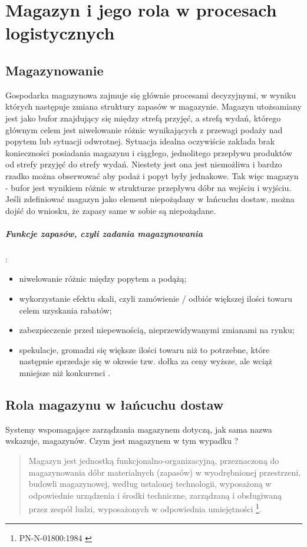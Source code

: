 \chapter{Magazyn i jego rola w procesach logistycznych}
\label{c4:c4}

\section{Magazynowanie}
	Gospodarka magazynowa zajmuje się głównie procesami decyzyjnymi, w wyniku których następuje 
	zmiana struktury zapasów w magazynie. Magazyn utożsamiany jest jako bufor znajdujący się
	między strefą przyjęć, a strefą wydań, którego głównym celem jest niwelowanie
	różnic wynikających z przewagi podaży nad popytem lub sytuacji odwrotnej. Sytuacja idealna
	oczywiście zakłada brak konieczności posiadania magazynu i ciągłego, jednolitego przepływu
	produktów od strefy przyjęć do strefy wydań. Niestety jest ona jest niemożliwa i bardzo
	rzadko można obserwować aby podaż i popyt były jednakowe. Tak więc magazyn - bufor jest
	wynikiem różnic w strukturze przepływu dóbr na wejściu i wyjściu. 
	Jeśli zdefiniować magazyn jako element niepożądany w łańcuchu dostaw, można dojść do wniosku, 
	że zapasy same w sobie są niepożądane.

	\paragraph{Funkcje zapasów, czyli zadania magazynowania}:
	\begin{itemize}
		\item niwelowanie różnic między popytem a podążą;
		\item wykorzystanie efektu skali, czyli zamówienie / odbiór większej ilości towaru celem uzyskania
		rabatów;
		\item zabezpieczenie przed niepewnością, nieprzewidywanymi zmianami na rynku;
		\item spekulacje, gromadzi się większe ilości towaru niż to potrzebne, które następnie sprzedaje się
		w okresie tzw. dołka za ceny wyższe, ale wciąż mniejsze niż konkurenci \cite{systemyLogistyczne_pfohl}.
	\end{itemize}		
	 
\section{Rola magazynu w łańcuchu dostaw}
	Systemy wspomagające zarządzania magazynem dotyczą, jak sama nazwa wskazuje, magazynów.
	Czym jest magazynem w tym wypadku ?
	\begin{quotation}
		Magazyn jest jednostką funkcjonalno-organizacyjną, przeznaczoną do magazynowania
		dóbr materialnych (zapasów) w wyodrębnionej przestrzeni, budowli magazynowej, według ustalonej
		technologii, wyposażoną w odpowiednie urządzenia i środki techniczne, zarządzaną i obsługiwaną
		przez zespół ludzi, wyposażonych w odpowiednia umiejętności \footnote{PN-N-01800:1984 \cite{norm_warehouse_defintion}}.
	\end{quotation}
	
